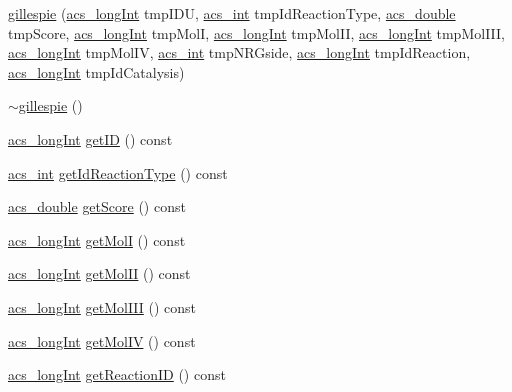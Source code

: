 \begin{DoxyCompactItemize}
\item 
\hyperlink{a00015_a0a38f4fd563208beba389f7f8e8eed4a}{gillespie} (\hyperlink{a00050_a19319d75f02db4308bc5c0026d98cd85}{acs\-\_\-long\-Int} tmp\-I\-D\-U, \hyperlink{a00050_a8d277355641a098190360234e2ebde35}{acs\-\_\-int} tmp\-Id\-Reaction\-Type, \hyperlink{a00050_ab776853a005fcbf56af0424a2a4dd607}{acs\-\_\-double} tmp\-Score, \hyperlink{a00050_a19319d75f02db4308bc5c0026d98cd85}{acs\-\_\-long\-Int} tmp\-Mol\-I, \hyperlink{a00050_a19319d75f02db4308bc5c0026d98cd85}{acs\-\_\-long\-Int} tmp\-Mol\-I\-I, \hyperlink{a00050_a19319d75f02db4308bc5c0026d98cd85}{acs\-\_\-long\-Int} tmp\-Mol\-I\-I\-I, \hyperlink{a00050_a19319d75f02db4308bc5c0026d98cd85}{acs\-\_\-long\-Int} tmp\-Mol\-I\-V, \hyperlink{a00050_a8d277355641a098190360234e2ebde35}{acs\-\_\-int} tmp\-N\-R\-Gside, \hyperlink{a00050_a19319d75f02db4308bc5c0026d98cd85}{acs\-\_\-long\-Int} tmp\-Id\-Reaction, \hyperlink{a00050_a19319d75f02db4308bc5c0026d98cd85}{acs\-\_\-long\-Int} tmp\-Id\-Catalysis)
\item 
\hyperlink{a00015_a33a97651932d8f82d82d164c94a2eae7}{$\sim$gillespie} ()
\item 
\hyperlink{a00050_a19319d75f02db4308bc5c0026d98cd85}{acs\-\_\-long\-Int} \hyperlink{a00015_a6aba3b283efc955bd4869f663ab877d6}{get\-I\-D} () const 
\item 
\hyperlink{a00050_a8d277355641a098190360234e2ebde35}{acs\-\_\-int} \hyperlink{a00015_a25d1e86363cdd7fabbb624b85620d1db}{get\-Id\-Reaction\-Type} () const 
\item 
\hyperlink{a00050_ab776853a005fcbf56af0424a2a4dd607}{acs\-\_\-double} \hyperlink{a00015_aa0ba52c30f6172a034e3b29afd074106}{get\-Score} () const 
\item 
\hyperlink{a00050_a19319d75f02db4308bc5c0026d98cd85}{acs\-\_\-long\-Int} \hyperlink{a00015_a8de52ad4b41daa64e69c897541b69629}{get\-Mol\-I} () const 
\item 
\hyperlink{a00050_a19319d75f02db4308bc5c0026d98cd85}{acs\-\_\-long\-Int} \hyperlink{a00015_a842457bf58d6af34b992a2c3fe27e4f6}{get\-Mol\-I\-I} () const 
\item 
\hyperlink{a00050_a19319d75f02db4308bc5c0026d98cd85}{acs\-\_\-long\-Int} \hyperlink{a00015_ab3d608ab2016a5a06408a76a1d12aabf}{get\-Mol\-I\-I\-I} () const 
\item 
\hyperlink{a00050_a19319d75f02db4308bc5c0026d98cd85}{acs\-\_\-long\-Int} \hyperlink{a00015_a01e1fb80634ae8fd32ce20fd7b5181ba}{get\-Mol\-I\-V} () const 
\item 
\hyperlink{a00050_a19319d75f02db4308bc5c0026d98cd85}{acs\-\_\-long\-Int} \hyperlink{a00015_a8d4daffecd91b32fb59a94eae6de8d0e}{get\-Reaction\-I\-D} () const 

\end{DoxyCompactItemize}
